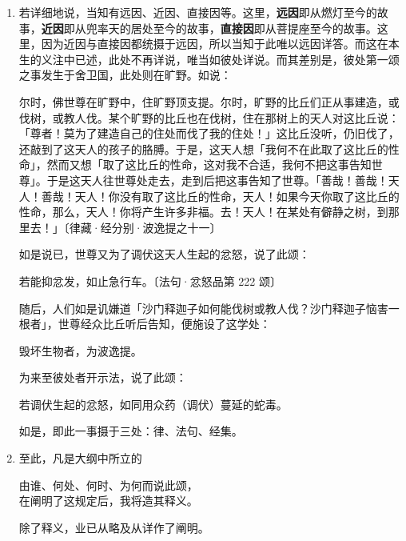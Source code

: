 \begin{enumerate}
\item 若详细地说，当知有远因、近因、直接因等。这里，\textbf{远因}即从燃灯至今的故事，\textbf{近因}即从兜率天的居处至今的故事，\textbf{直接因}即从菩提座至今的故事。这里，因为近因与直接因都统摄于远因，所以当知于此唯以远因详答。而这在本生的义注中已述，此处不再详说，唯当如彼处详说。而其差别是，彼处第一颂之事发生于舍卫国，此处则在旷野。如说：\begin{quoting}尔时，佛世尊在旷野中，住旷野顶支提。尔时，旷野的比丘们正从事建造，或伐树，或教人伐。某个旷野的比丘也在伐树，住在那树上的天人对这比丘说：「尊者！莫为了建造自己的住处而伐了我的住处！」这比丘没听，仍旧伐了，还敲到了这天人的孩子的胳膊。于是，这天人想「我何不在此取了这比丘的性命」，然而又想「取了这比丘的性命，这对我不合适，我何不把这事告知世尊」。于是这天人往世尊处走去，走到后把这事告知了世尊。「善哉！善哉！天人！善哉！天人！你没有取了这比丘的性命，天人！如果今天你取了这比丘的性命，那么，天人！你将产生许多非福。去！天人！在某处有僻静之树，到那里去！」{\bluefootnotesize 〔律藏·经分别·波逸提之十一〕}\end{quoting}如是说已，世尊又为了调伏这天人生起的忿怒，说了此颂：\begin{quoting}若能抑忿发，如止急行车。{\bluefootnotesize 〔法句·忿怒品第 222 颂〕}\end{quoting}随后，人们如是讥嫌道「沙门释迦子如何能伐树或教人伐？沙门释迦子恼害一根者」，世尊经众比丘听后告知，便施设了这学处：\begin{quoting}毁坏生物者，为波逸提。\end{quoting}为来至彼处者开示法，说了此颂：\begin{quoting}若调伏生起的忿怒，如同用众药（调伏）蔓延的蛇毒。\end{quoting}如是，即此一事摄于三处：律、法句、经集。
\item 至此，凡是大纲中所立的\begin{quoting}由谁、何处、何时、为何而说此颂，\\在阐明了这规定后，我将造其释义。\end{quoting}除了释义，业已从略及从详作了阐明。

\end{enumerate}
